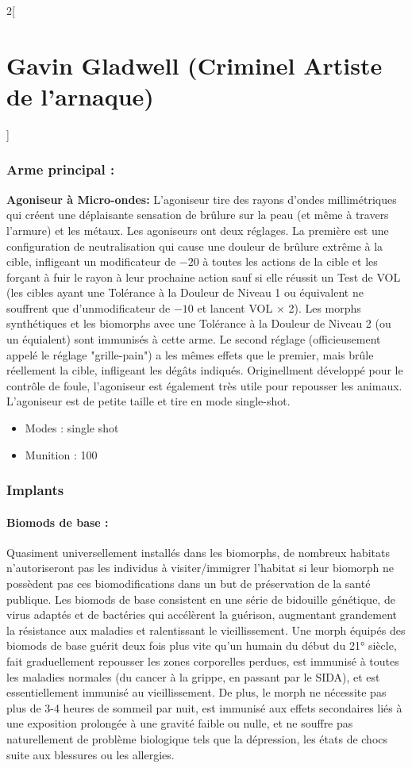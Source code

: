 \documentclass[a4paper,9pt]{article}
\begin{document}
\begin{multicols}{2}[\section*{Gavin Gladwell (Criminel Artiste de l'arnaque)}]
\subsubsection*{Arme principal :}

\textbf{Agoniseur à Micro-ondes:} L'agoniseur tire des rayons d'ondes
millimétriques qui créent une déplaisante sensation de brûlure sur la peau  (et
même à travers l'armure) et les métaux. Les agoniseurs ont deux réglages. La
première est une configuration de neutralisation qui cause une douleur de
brûlure extrême à la cible, infligeant un modificateur de $-20$ à toutes les
actions de la cible et les forçant à fuir le rayon à leur prochaine action sauf
si elle réussit un Test de VOL (les cibles ayant une Tolérance à la Douleur de
Niveau 1 ou équivalent ne souffrent que d'unmodificateur de $-10$ et lancent
VOL $\times$ 2). Les morphs synthétiques et les biomorphs avec une Tolérance à
la Douleur de Niveau 2 (ou un équialent) sont immunisés à cette arme. Le second
réglage (officieusement appelé le réglage "grille-pain") a les mêmes effets que
le premier, mais brûle réellement la cible, infligeant les dégâts indiqués.
Originellment développé pour le contrôle de foule, l'agoniseur est également
très utile pour repousser les animaux. L'agoniseur est de petite taille et tire
en mode single-shot.

\begin{itemize}
   \item Modes : single shot
   \item Munition : 100
\end{itemize}

\subsubsection*{Implants}

\paragraph{Biomods de base :} 
Quasiment universellement  installés dans les biomorphs, de nombreux habitats
n'autoriseront pas les individus à visiter/immigrer l'habitat si leur biomorph
ne possèdent pas ces biomodifications dans un but de préservation de la santé
publique. Les biomods de base consistent en une série de bidouille génétique,
de virus adaptés et de bactéries qui accélèrent la guérison, augmentant
grandement la résistance aux maladies et ralentissant le vieillissement. Une
morph équipés des biomods de base guérit deux fois plus vite qu'un humain du
début du 21° siècle, fait graduellement repousser les zones corporelles
perdues, est immunisé à toutes les maladies normales (du cancer à la grippe, en
passant par le SIDA), et est essentiellement immunisé au vieillissement. De
plus, le morph ne nécessite pas plus de 3-4 heures de sommeil par nuit, est
immunisé aux effets secondaires liés à une exposition prolongée à une gravité
faible ou nulle, et ne souffre pas naturellement de problème biologique tels
que la dépression, les états de chocs suite aux blessures ou les allergies.


\end{multicols}
\end{document}
